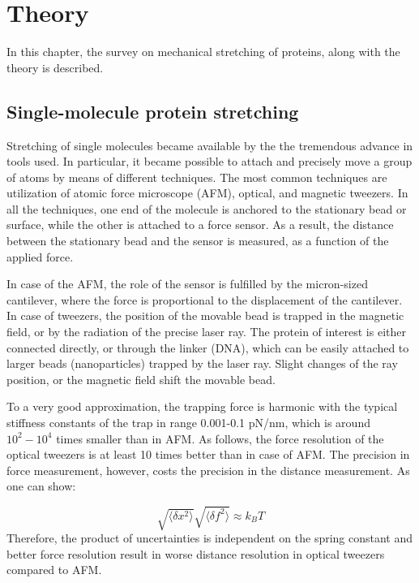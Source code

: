 \chapter{Theory}
\label{ch:theory}
In this chapter, the survey on mechanical stretching of proteins, along with the theory is described.

\section{Single-molecule protein stretching}
\label{sec:theory-single}
Stretching of single molecules became available by the the tremendous advance in tools used.
In particular, it became possible to attach and precisely move a group of atoms by means of different techniques.
The most common techniques are utilization of atomic force microscope (AFM), optical, and magnetic tweezers\cite{neuman2008single}.
In all the techniques, one end of the molecule is anchored to the stationary bead or surface, while the other is attached to a force sensor.
As a result, the distance between the stationary bead and the sensor is measured, as a function of the applied force.

In case of the AFM, the role of the sensor is fulfilled by the micron-sized cantilever, where the force is proportional to the displacement of the cantilever.
In case of tweezers, the position of the movable bead is trapped in the magnetic field, or by the radiation of the precise laser ray.
The protein of interest is either connected directly, or through the linker (DNA), which can be easily attached to larger beads (nanoparticles) trapped by the laser ray.
Slight changes of the ray position, or the magnetic field shift the movable bead.

To a very good approximation, the trapping force is harmonic with the typical stiffness constants of the trap in range 0.001-0.1 pN/nm, which is around $10^2-10^4$ times smaller than in AFM\cite{neuman2004optical}.
As follows, the force resolution of the optical tweezers is at least 10 times better than in case of AFM\@.
The precision in force measurement, however, costs the precision in the distance measurement.
As one can show\cite{kumar2010biomolecules}:

\begin{equation}
    \sqrt{\langle\delta x^2\rangle}\sqrt{\langle\delta f^2\rangle}\approx k_{B}T
    \label{eq:afm-precision}
\end{equation}
Therefore, the product of uncertainties is independent on the spring constant and better force resolution result in worse distance resolution in optical tweezers compared to AFM\@.


